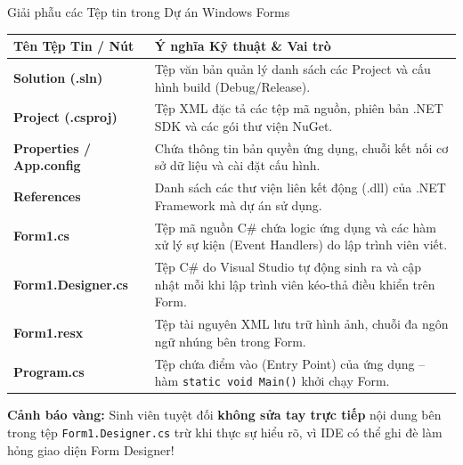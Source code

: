 \documentclass[aspectratio=169, 10pt]{beamer}
\begin{document}
\begin{frame}{Giải phẫu các Tệp tin trong Dự án Windows Forms}
  \begin{table}\footnotesize
    \centering
    \begin{tabularx}{\textwidth}{lX}
      \toprule
      \textbf{Tên Tệp Tin / Nút} & \textbf{Ý nghĩa Kỹ thuật \& Vai trò} \\
      \midrule
      \textbf{Solution (.sln)} & Tệp văn bản quản lý danh sách các Project và cấu hình build (Debug/Release). \\
      \textbf{Project (.csproj)} & Tệp XML đặc tả các tệp mã nguồn, phiên bản .NET SDK và các gói thư viện NuGet. \\
      \textbf{Properties / App.config} & Chứa thông tin bản quyền ứng dụng, chuỗi kết nối cơ sở dữ liệu và cài đặt cấu hình. \\
      \textbf{References} & Danh sách các thư viện liên kết động (.dll) của .NET Framework mà dự án sử dụng. \\
      \textbf{Form1.cs} & Tệp mã nguồn C\# chứa logic ứng dụng và các hàm xử lý sự kiện (Event Handlers) do lập trình viên viết. \\
      \textbf{Form1.Designer.cs} & Tệp C\# do Visual Studio tự động sinh ra và cập nhật mỗi khi lập trình viên kéo-thả điều khiển trên Form. \\
      \textbf{Form1.resx} & Tệp tài nguyên XML lưu trữ hình ảnh, chuỗi đa ngôn ngữ nhúng bên trong Form. \\
      \textbf{Program.cs} & Tệp chứa điểm vào (Entry Point) của ứng dụng -- hàm \texttt{static void Main()} khởi chạy Form. \\
      \bottomrule
    \end{tabularx}
  \end{table}
  \vspace{-1mm}
  \begin{alertblock}{\textbf{Cảnh báo vàng:}}
    Sinh viên tuyệt đối \textbf{không sửa tay trực tiếp} nội dung bên trong tệp \texttt{Form1.Designer.cs} trừ khi thực sự hiểu rõ, vì IDE có thể ghi đè làm hỏng giao diện Form Designer!
  \end{alertblock}
\end{frame}
\end{document}
